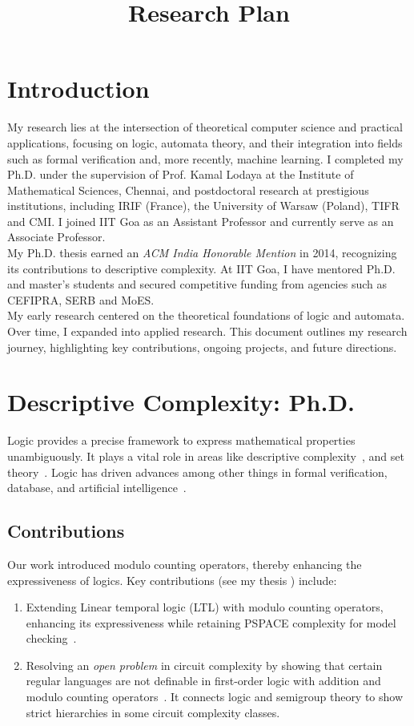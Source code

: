 \documentclass[11pt,a4paper,sans]{moderncv} %
\title{Research Plan}
\begin{document}
\makecvtitle %

\section{Introduction}
My research lies at the intersection of theoretical computer science and practical applications, focusing on logic, automata theory, and their integration into fields such as formal verification and, more recently, machine learning. I completed my Ph.D. under the supervision of Prof. Kamal Lodaya at the Institute of Mathematical Sciences, Chennai, and postdoctoral research at prestigious institutions, including IRIF (France), the University of Warsaw (Poland), TIFR and CMI. I joined IIT Goa as an Assistant Professor and currently serve as an Associate Professor. \\


My Ph.D. thesis earned an \emph{ACM India Honorable Mention} in 2014, recognizing its contributions to descriptive complexity. At IIT Goa, I have mentored Ph.D. and master's students and secured competitive funding from agencies such as CEFIPRA, SERB and MoES.\\

My early research centered on the theoretical foundations of logic and automata. Over time, I expanded into applied research.
This document outlines my research journey, highlighting key contributions, ongoing projects, and future directions.
\section{Descriptive Complexity: Ph.D.}
Logic provides a precise framework to express mathematical properties unambiguously. It plays a vital role in areas like descriptive complexity~\cite{immerman_book}, and set theory~\cite{ject_setTheory}.
Logic has driven advances among other things in formal verification, database, and artificial intelligence~\cite{vardi_logicEffectiveness}.

\subsection{Contributions}
Our work introduced modulo counting operators, thereby enhancing the expressiveness of logics. Key contributions (see my thesis \cite{sav_thesis}) include:
\begin{enumerate}
 \item Extending Linear temporal logic (\textsf{LTL}) with modulo counting operators, enhancing its expressiveness while retaining PSPACE complexity for model checking~\cite{my_ltlmod,my_ltlsuccinct}.
 \item Resolving an \emph{open problem} in circuit complexity by showing that certain regular languages are not definable in first-order logic with addition and modulo counting operators~\cite{my_foplus}. It connects logic and semigroup theory to show strict hierarchies in some circuit complexity classes.
\end{enumerate}
\end{document}
